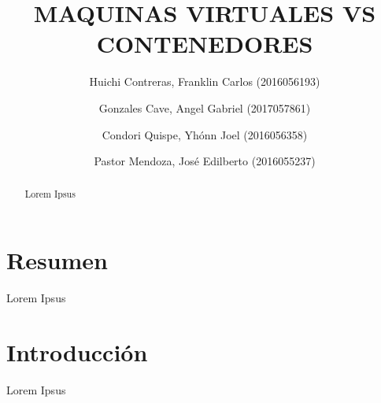 \documentclass[preprint,12pt]{elsarticle}
\begin{document}
	
	\begin{frontmatter} 

		\title{\huge MAQUINAS VIRTUALES VS CONTENEDORES}
		
		\author{Huichi Contreras, Franklin Carlos            (2016056193)}
		\author{Gonzales Cave, Angel Gabriel                 (2017057861)}
		\author{Condori Quispe, Yhónn Joel	         	   (2016056358)} 
		\author{Pastor Mendoza, José Edilberto              (2016055237)} 
		\address{Escuela Profesional de Ingeniería de Sistemas}
		\address{Universidad Privada de Tacna}
		\address{Tacna, Perú}
		

		\begin{abstract}
Lorem Ipsus

		\end{abstract}


	\end{frontmatter}


\section{Resumen}
Lorem Ipsus





\section{Introducción} 

Lorem Ipsus



\end{document}
